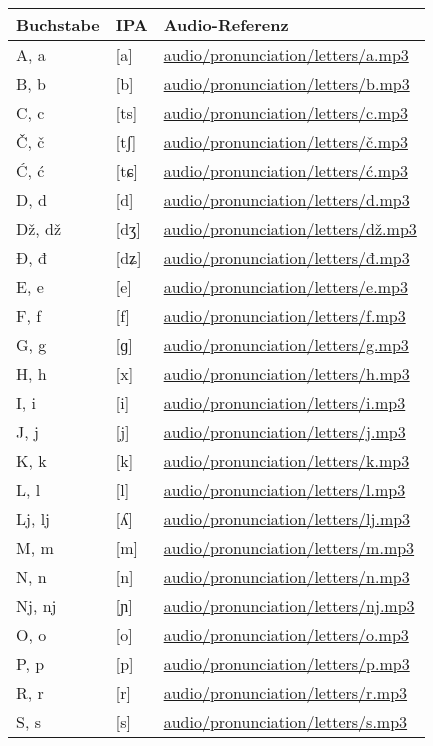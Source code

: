 \begin{center}
\begin{tabular}{lll}
\toprule
\textbf{Buchstabe} & \textbf{IPA} & \textbf{Audio-Referenz} \\
\midrule
A, a & [a] & \small\url{audio/pronunciation/letters/a.mp3} \\
B, b & [b] & \small\url{audio/pronunciation/letters/b.mp3} \\
C, c & [ts] & \small\url{audio/pronunciation/letters/c.mp3} \\
Č, č & [tʃ] & \small\url{audio/pronunciation/letters/č.mp3} \\
Ć, ć & [tɕ] & \small\url{audio/pronunciation/letters/ć.mp3} \\
D, d & [d] & \small\url{audio/pronunciation/letters/d.mp3} \\
Dž, dž & [dʒ] & \small\url{audio/pronunciation/letters/dž.mp3} \\
Đ, đ & [dʑ] & \small\url{audio/pronunciation/letters/đ.mp3} \\
E, e & [e] & \small\url{audio/pronunciation/letters/e.mp3} \\
F, f & [f] & \small\url{audio/pronunciation/letters/f.mp3} \\
G, g & [ɡ] & \small\url{audio/pronunciation/letters/g.mp3} \\
H, h & [x] & \small\url{audio/pronunciation/letters/h.mp3} \\
I, i & [i] & \small\url{audio/pronunciation/letters/i.mp3} \\
J, j & [j] & \small\url{audio/pronunciation/letters/j.mp3} \\
K, k & [k] & \small\url{audio/pronunciation/letters/k.mp3} \\
L, l & [l] & \small\url{audio/pronunciation/letters/l.mp3} \\
Lj, lj & [ʎ] & \small\url{audio/pronunciation/letters/lj.mp3} \\
M, m & [m] & \small\url{audio/pronunciation/letters/m.mp3} \\
N, n & [n] & \small\url{audio/pronunciation/letters/n.mp3} \\
Nj, nj & [ɲ] & \small\url{audio/pronunciation/letters/nj.mp3} \\
O, o & [o] & \small\url{audio/pronunciation/letters/o.mp3} \\
P, p & [p] & \small\url{audio/pronunciation/letters/p.mp3} \\
R, r & [r] & \small\url{audio/pronunciation/letters/r.mp3} \\
S, s & [s] & \small\url{audio/pronunciation/letters/s.mp3} \\

\end{tabular}
\end{center}
